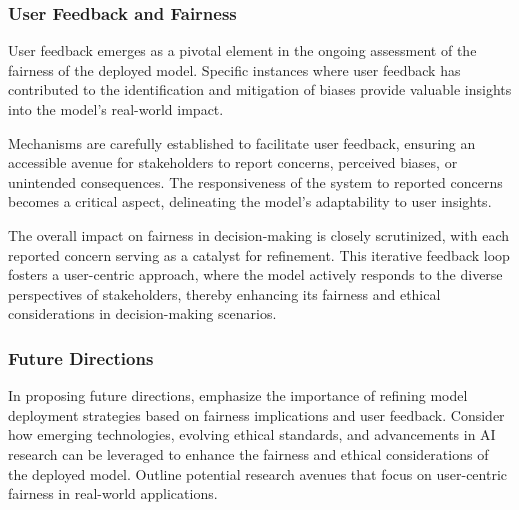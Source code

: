 \subsubsection{User Feedback and Fairness}

User feedback emerges as a pivotal element in the ongoing assessment of the fairness of the deployed model. Specific instances where user feedback has contributed to the identification and mitigation of biases provide valuable insights into the model's real-world impact.

Mechanisms are carefully established to facilitate user feedback, ensuring an accessible avenue for stakeholders to report concerns, perceived biases, or unintended consequences. The responsiveness of the system to reported concerns becomes a critical aspect, delineating the model's adaptability to user insights.

The overall impact on fairness in decision-making is closely scrutinized, with each reported concern serving as a catalyst for refinement. This iterative feedback loop fosters a user-centric approach, where the model actively responds to the diverse perspectives of stakeholders, thereby enhancing its fairness and ethical considerations in decision-making scenarios.

\subsubsection{Future Directions}

In proposing future directions, emphasize the importance of refining model deployment strategies based on fairness implications and user feedback. Consider how emerging technologies, evolving ethical standards, and advancements in AI research can be leveraged to enhance the fairness and ethical considerations of the deployed model. Outline potential research avenues that focus on user-centric fairness in real-world applications.

